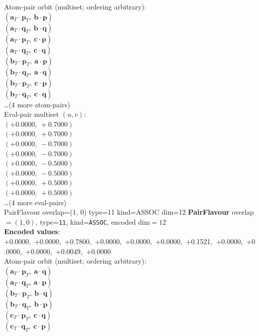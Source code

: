 \documentclass[a4paper,11pt]{article}
\newcommand{\pdcegfomjfhook}[2]{\mathbf{#1} \cdot \mathbf{#2}}
\newcommand{\fpbeomcfokjooi}[2]{\mathbf{#1}_T \cdot \mathbf{#2}_T}
\begin{document}
\quad Atom-pair orbit (multiset; ordering arbitrary):\\
$(\fpbeomcfokjooi{a}{p},\ \pdcegfomjfhook{b}{p})$\\
$(\fpbeomcfokjooi{a}{q},\ \pdcegfomjfhook{b}{q})$\\
$(\fpbeomcfokjooi{a}{p},\ \pdcegfomjfhook{c}{p})$\\
$(\fpbeomcfokjooi{a}{q},\ \pdcegfomjfhook{c}{q})$\\
$(\fpbeomcfokjooi{b}{p},\ \pdcegfomjfhook{a}{p})$\\
$(\fpbeomcfokjooi{b}{q},\ \pdcegfomjfhook{a}{q})$\\
$(\fpbeomcfokjooi{b}{p},\ \pdcegfomjfhook{c}{p})$\\
$(\fpbeomcfokjooi{b}{q},\ \pdcegfomjfhook{c}{q})$\\
\quad \ldots (4 more atom-pairs)\\
\quad Eval-pair multiset $(u, v)$:\\
$(+0.0000,\ +0.7000)$\\
$(+0.0000,\ +0.7000)$\\
$(+0.0000,\ -0.7000)$\\
$(+0.0000,\ -0.7000)$\\
$(+0.0000,\ -0.5000)$\\
$(+0.0000,\ -0.5000)$\\
$(+0.0000,\ +0.5000)$\\
$(+0.0000,\ +0.5000)$\\
\quad \ldots (4 more eval-pairs)\\
    PairFlavour  overlap=(1, 0)  type=11  kind=ASSOC  dim=12
\textbf{PairFlavour} overlap$=(1, 0)$, type=\texttt{11}, kind=\texttt{ASSOC}, encoded dim$=12$\\
\textbf{      Encoded values}: +0.0000,\ +0.0000,\ +0.7800,\ +0.0000,\ +0.0000,\ +0.0000,\ +0.1521,\ +0.0000,\ +0.0000,\ +0.0000,\ +0.0049,\ +0.0000\\
\quad Atom-pair orbit (multiset; ordering arbitrary):\\
$(\fpbeomcfokjooi{a}{p},\ \pdcegfomjfhook{a}{q})$\\
$(\fpbeomcfokjooi{a}{q},\ \pdcegfomjfhook{a}{p})$\\
$(\fpbeomcfokjooi{b}{p},\ \pdcegfomjfhook{b}{q})$\\
$(\fpbeomcfokjooi{b}{q},\ \pdcegfomjfhook{b}{p})$\\
$(\fpbeomcfokjooi{c}{p},\ \pdcegfomjfhook{c}{q})$\\
$(\fpbeomcfokjooi{c}{q},\ \pdcegfomjfhook{c}{p})$\\
\end{document}
